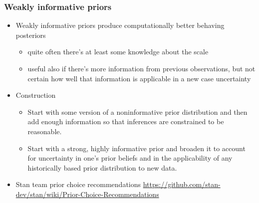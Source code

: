 \documentclass[10pt,handout]{beamer}
\begin{document}
\begin{frame}

  \frametitle{Weakly informative priors}

  \begin{itemize}
  \item Weakly informative priors produce computationally better
    behaving posteriors
    \begin{itemize}
    \item quite often there's at least some knowledge about the
      scale
    \item useful also if there's more information from previous
      observations, but not certain how well that information is
      applicable in a new case uncertainty
    \end{itemize}
    \pause
    \item Construction
      \begin{itemize}
      \item Start with some version of a noninformative prior distribution and then add enough
        information so that inferences are constrained to be reasonable.
      \item Start with a strong, highly informative prior and broaden it to account for uncertainty
        in one's prior beliefs and in the applicability of any historically based prior distribution
        to new data.
      \end{itemize}
    \item Stan team prior choice recommendations \url{https://github.com/stan-dev/stan/wiki/Prior-Choice-Recommendations}
  \end{itemize}

\end{frame}
\end{document}
